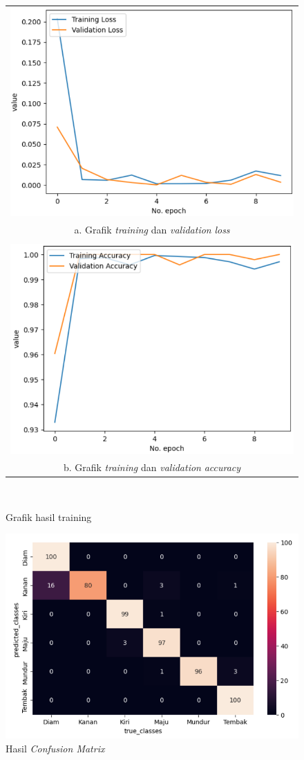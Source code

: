 \documentclass[conference]{IEEEtran}
\begin{document}
\begin{figure}[H]
    \centering
    \begin{tabular}{l}
        \multicolumn{1}{c}{\includegraphics[width=0.65\linewidth]{../Gambar/loss.png}} \\
        \multicolumn{1}{c}{a. Grafik \emph{training} dan \emph{validation} \emph{loss}} \\ \\
        \multicolumn{1}{c}{\includegraphics[width=0.65\linewidth]{../Gambar/akurasi.png}} \\
        \multicolumn{1}{c}{b. Grafik \emph{training} dan \emph{validation} \emph{accuracy}} \\   
    \end{tabular}
    \caption{Grafik hasil training}\
    \label{fig:hasiltraining}
\end{figure}

\begin{figure}[H]
  \centering
  \includegraphics[width=0.7\linewidth]{../Gambar/confusionmatrix.png}
  \caption{Hasil \emph{Confusion Matrix}}
  \label{fig:confusionmatrix}
\end{figure}
\end{document}
